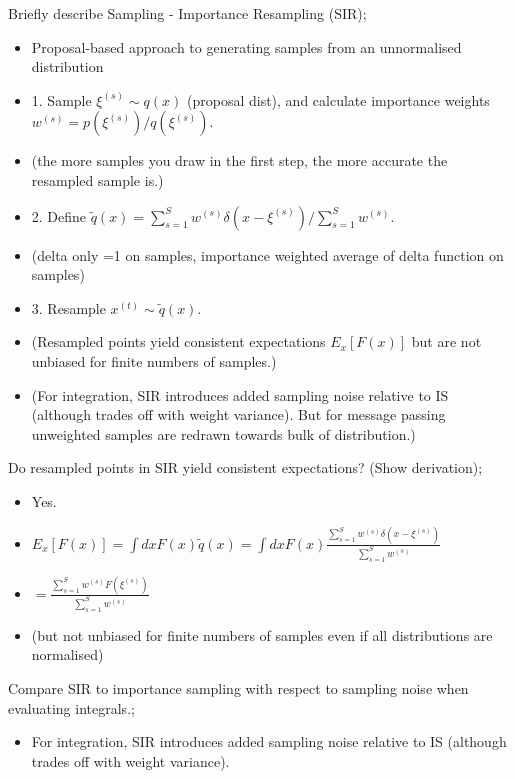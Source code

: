 \documentclass{article}
\begin{document}


Briefly describe Sampling - Importance Resampling (SIR); \begin{itemize} \item Proposal-based approach to generating samples from an unnormalised distribution \item 1. Sample $\xi^{(s)} \sim q(x)$ (proposal dist), and calculate importance weights $w^{(s)} = p(\xi^{(s)})/q(\xi^{(s)})$. \item (the more samples you draw in the first step, the more accurate the resampled sample is.) \item 2. Define $\tilde{q}(x) = \sum_{s=1}^S w^{(s)}\delta(x-\xi^{(s)})/\sum_{s=1}^S w^{(s)}$. \item (delta only =1 on samples, importance weighted average of delta function on samples) \item 3. Resample $x^{(t)}\sim \tilde{q}(x)$. \item (Resampled points yield consistent expectations $E_x[F(x)]$ but are not unbiased for finite numbers of samples.) \item (For integration, SIR introduces added sampling noise relative to IS (although trades off with weight variance). But for message passing unweighted samples are redrawn towards bulk of distribution.) \end{itemize}

Do resampled points in SIR yield consistent expectations? (Show derivation); \begin{itemize} \item Yes. \item $E_x[F(x)] = \int dx F(x)\tilde{q}(x) = \int dx F(x) \frac{\sum_{s=1}^S w^{(s)}\delta(x-\xi^{(s)})}{\sum_{s=1}^Sw^{(s)}}$ \item $=\frac{\sum_{s=1}^S w^{(s)}F(\xi^{(s)})}{\sum_{s=1}^Sw^{(s)}}$ \item (but not unbiased for finite numbers of samples even if all distributions are normalised) \end{itemize}

Compare SIR to importance sampling with respect to sampling noise when evaluating integrals.; \begin{itemize} \item For integration, SIR introduces added sampling noise relative to IS (although trades off with weight variance).  \end{itemize}
\end{document}
